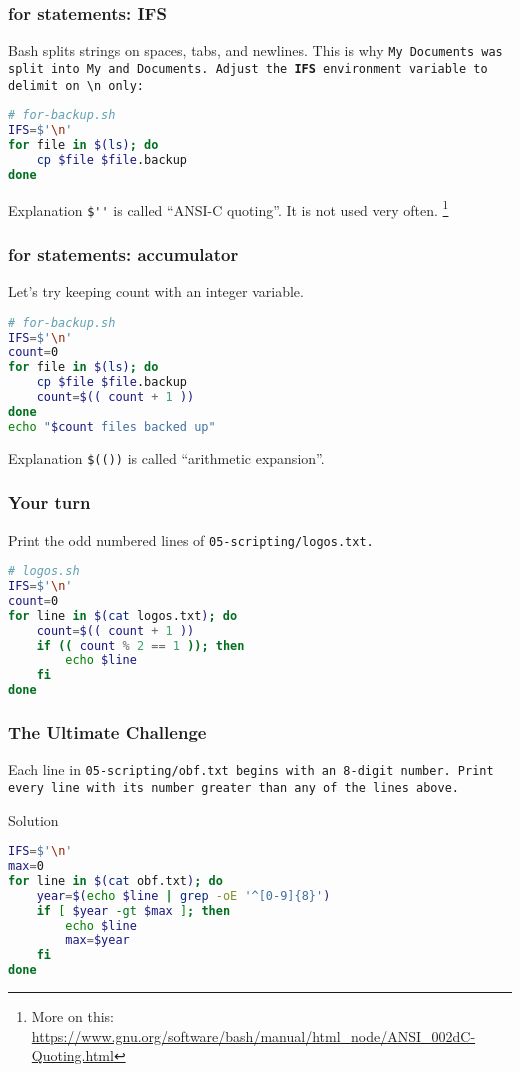 \begin{frame}[fragile]
\frametitle{\textbf{for} statements: IFS}
Bash splits strings on spaces, tabs, and newlines.
This is why \tt{My Documents} was split into \tt{My} and \tt{Documents}.
\newline \newline
Adjust the \textbf{IFS} environment variable to delimit on \verb|\n| only:
\begin{lstlisting}[language=bash]
# for-backup.sh
IFS=$'\n'
for file in $(ls); do
    cp $file $file.backup
done
\end{lstlisting}
\begin{block}{Explanation}
    \verb|$''| is called ``ANSI-C quoting''. It is not used very often.
    \footnote{
        More on this:
        \url{https://www.gnu.org/software/bash/manual/html_node/ANSI_002dC-Quoting.html}
    }
\end{block}
\end{frame}

\begin{frame}[fragile]
\frametitle{\textbf{for} statements: accumulator}
Let's try keeping count with an integer variable.
\begin{lstlisting}[language=bash]
# for-backup.sh
IFS=$'\n'
count=0
for file in $(ls); do
    cp $file $file.backup
    count=$(( count + 1 ))
done
echo "$count files backed up"
\end{lstlisting}
\begin{block}{Explanation}
    \verb|$(())| is called ``arithmetic expansion''.
\end{block}
\end{frame}

\begin{frame}[fragile]
\frametitle{Your turn}
Print the odd numbered lines of \tt{05-scripting/logos.txt}.
\pause
\begin{lstlisting}[language=bash]
# logos.sh
IFS=$'\n'
count=0
for line in $(cat logos.txt); do
	count=$(( count + 1 ))
	if (( count % 2 == 1 )); then
		echo $line
	fi
done
\end{lstlisting}
\end{frame}

\begin{frame}[fragile]
\frametitle{The Ultimate Challenge}
Each line in \tt{05-scripting/obf.txt} begins with an 8-digit number.
Print every line with its number greater than any of the lines above.
\pause
\begin{block}{Solution}
\begin{lstlisting}[language=bash]
IFS=$'\n'
max=0
for line in $(cat obf.txt); do
	year=$(echo $line | grep -oE '^[0-9]{8}')
	if [ $year -gt $max ]; then
		echo $line
		max=$year
	fi
done
\end{lstlisting}
\end{block}
\end{frame}
